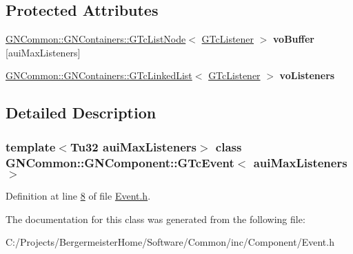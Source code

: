 \subsection*{Protected Attributes}
\begin{DoxyCompactItemize}
\item 
\mbox{\label{class_g_n_common_1_1_g_n_component_1_1_g_tc_event_a2c7fde6aa76e38ce816fbad446b2f3ea}} 
\mbox{\hyperlink{class_g_n_common_1_1_g_n_containers_1_1_g_tc_list_node}{G\+N\+Common\+::\+G\+N\+Containers\+::\+G\+Tc\+List\+Node}}$<$ \mbox{\hyperlink{class_g_n_common_1_1_g_n_component_1_1_g_tc_listener}{G\+Tc\+Listener}} $>$ {\bfseries vo\+Buffer} \mbox{[}aui\+Max\+Listeners\mbox{]}
\item 
\mbox{\label{class_g_n_common_1_1_g_n_component_1_1_g_tc_event_a1158c71b941779b471dd3905737e38f0}} 
\mbox{\hyperlink{class_g_n_common_1_1_g_n_containers_1_1_g_tc_linked_list}{G\+N\+Common\+::\+G\+N\+Containers\+::\+G\+Tc\+Linked\+List}}$<$ \mbox{\hyperlink{class_g_n_common_1_1_g_n_component_1_1_g_tc_listener}{G\+Tc\+Listener}} $>$ {\bfseries vo\+Listeners}
\end{DoxyCompactItemize}


\subsection{Detailed Description}
\subsubsection*{template$<$Tu32 aui\+Max\+Listeners$>$\newline
class G\+N\+Common\+::\+G\+N\+Component\+::\+G\+Tc\+Event$<$ aui\+Max\+Listeners $>$}



Definition at line \mbox{\hyperlink{_event_8h_source_l00008}{8}} of file \mbox{\hyperlink{_event_8h_source}{Event.\+h}}.



The documentation for this class was generated from the following file\+:\begin{DoxyCompactItemize}
\item 
C\+:/\+Projects/\+Bergermeister\+Home/\+Software/\+Common/inc/\+Component/Event.\+h\end{DoxyCompactItemize}
